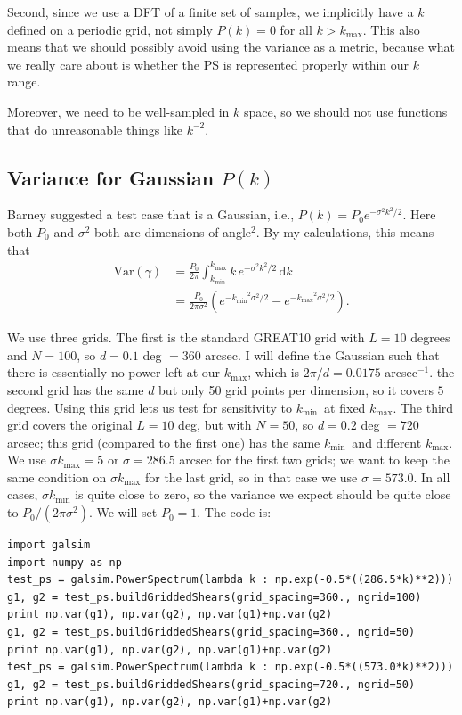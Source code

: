 \documentclass[preprint]{aastex}
\newcommand{\kmax}{\ensuremath{k_\mathrm{max}}}
\newcommand{\kmin}{\ensuremath{k_\mathrm{min}}}
\newcommand{\rmd}{\ensuremath{\mathrm{d}}}
\begin{document}
Second, since we use a DFT of a finite set of samples, we implicitly
have a $k$ defined on a periodic grid, not simply $P(k)=0$ for all
$k>\kmax$.  This also means that we should possibly avoid using the
variance as a metric, because what we really care about is whether the
PS is represented properly within our $k$ range.

Moreover, we need to be well-sampled in $k$ space, so we should not
use functions that do unreasonable things like $k^{-2}$.

\subsection{Variance for Gaussian $P(k)$}

Barney suggested a test case that is a Gaussian, i.e., $P(k) =
P_0 e^{-\sigma^2 k^2 / 2}$.  Here both $P_0$ and $\sigma^2$ both
are dimensions of angle$^2$.  By my calculations, this means that
\begin{align}
\mathrm{Var}(\gamma) &= \frac{P_0}{2\pi}\int_{\kmin}^{\kmax} k \,
e^{-\sigma^2 k^2/2} \,\rmd k \\
 &= \frac{P_0}{2\pi\sigma^2} (e^{-\kmin^2\sigma^2/2}-e^{-\kmax^2\sigma^2/2}).
\end{align}

We use three grids. The first is the standard GREAT10 grid with $L=10$
degrees and $N=100$, so $d=0.1$ deg $=360$ arcsec.  I will define the
Gaussian such that there is essentially no power left at our \kmax,
which is $2\pi/d=0.0175$ arcsec$^{-1}$.  the second grid has the same
$d$ but only 50 grid points per dimension, so it covers $5$ degrees.
Using this grid lets us test for sensitivity to \kmin\ at fixed \kmax.
The third grid covers the original $L=10$ deg, but with $N=50$, so
$d=0.2$ deg $=720$ arcsec; this grid (compared to the first one) has the same \kmin\ and different \kmax. We use $\sigma \kmax=5$ or $\sigma=286.5$
arcsec for the first two grids; we want to keep the same condition on
$\sigma\kmax$ for the last grid, so in that case we use
$\sigma=573.0$.  In all cases, $\sigma\kmin$ is quite close to zero,
so the variance we expect should be quite close to
$P_0/(2\pi\sigma^2)$. We will set $P_0=1$. The code is:
\begin{verbatim}
import galsim
import numpy as np
test_ps = galsim.PowerSpectrum(lambda k : np.exp(-0.5*((286.5*k)**2)))
g1, g2 = test_ps.buildGriddedShears(grid_spacing=360., ngrid=100)
print np.var(g1), np.var(g2), np.var(g1)+np.var(g2)
g1, g2 = test_ps.buildGriddedShears(grid_spacing=360., ngrid=50)
print np.var(g1), np.var(g2), np.var(g1)+np.var(g2)
test_ps = galsim.PowerSpectrum(lambda k : np.exp(-0.5*((573.0*k)**2)))
g1, g2 = test_ps.buildGriddedShears(grid_spacing=720., ngrid=50)
print np.var(g1), np.var(g2), np.var(g1)+np.var(g2)
\end{verbatim}
\end{document}
